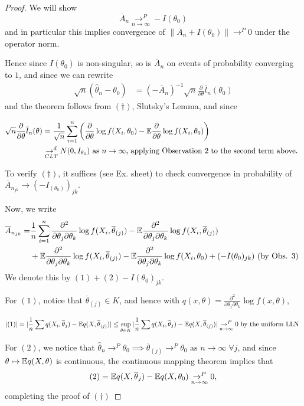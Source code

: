 \documentclass[a4paper]{article}
\begin{document}
\begin{proof}
	We will show
	\[
		\overline{A}_n \underset{n\to \infty}{\to ^{P}} -I(\theta_0) \tag{$\dagger$} 
	\]
	and in particular this implies convergence of $\|\overline{A}_n + I(\theta_0)\| \to ^{P} 0$ under the operator norm.

	Hence since $I(\theta_0)$ is non-singular, so is $\overline{A}_n$ on events of probability converging to $1$, and since we can rewrite
	\begin{align*}
		\sqrt{n}(\hat{\theta}_n - \theta_0) &= (-\overline{A}_n)^{-1} \sqrt{n} \frac{\partial}{\partial\theta} \overline{l}_n(\theta_0)   
	 \end{align*}
	 and the theorem follows from $(\dagger)$, Slutsky's Lemma, and since

	  \begin{align*}
		  \sqrt{n}\frac{\partial}{\partial\theta}\overline{l}_n(\theta) &= \frac{1}{\sqrt{n}} \sum_{i=1}^{n} \left( \frac{\partial}{\partial\theta} \log f(X_i, \theta_0) - \mathbb{E} \frac{\partial}{\partial\theta} \log f(X_i,\theta_0) \right) \\
		  & \underset{CLT}{\to ^{d}} N(0, I_{\theta_0}) \text{ as $n\to \infty$, applying Observation 2 to the second term above. } 
	 \end{align*}

	 To verify $(\dagger)$, it suffices (see Ex. sheet) to check convergence in probability of $\overline{A}_{n_{jk}}\to (-I_(\theta_0))_{jk}$.

	 Now, we write
	 \begin{align*}
		 \overline{A}_{n_{jk}} = &\frac{1}{n} \sum_{i=1}^{n}\frac{\partial^2}{\partial\theta_j \partial\theta_k} \log f(X_i, \overline{\theta}_{(j)}) - \mathbb{E} \frac{\partial^2}{\partial\theta_j \partial\theta_k} \log f(X_i, \overline{\theta}_{(j)}) \\
		 &+ \mathbb{E} \frac{\partial^2}{\partial\theta_j \partial\theta_k} \log f(X_i, \overline{\theta}_{(j)}) - \mathbb{E} \frac{\partial^2}{\partial\theta_j \partial\theta_k} \log f(X_i, \theta_0) + (-I(\theta_0)_{jk}) \text{ (by Obs. 3) } 
	 \end{align*}
	 We denote this by $(1) + (2) - I(\theta_0)_{jk}$.

	 For $(1)$, notice that $\overline{\theta}_{(j)} \in K$, and hence with $q(x,\theta) = \frac{\partial^2}{\partial\theta_j \partial\theta_k} \log f(x, \theta)$,

	 \[
		 |(1)| = |\frac{1}{n} \sum q(X_i, \overline{\theta}_j) - \mathbb{E} q(X, \overline{\theta}_{(j)})| \le \sup_{\theta \in K} |\frac{1}{n} \sum q(X_i, \overline{\theta}_j) - \mathbb{E} q(X, \overline{\theta}_{(j)})| \underset{n\to \infty}{\to ^{P}} 0 \text{ by the uniform LLN }
	 \] 

	 For $(2)$, we notice that  $\hat{\theta}_n \to ^{P} \theta_0 \implies \overline{\theta}_{(j)} \to ^{P} \theta_0 \text{ as } n\to \infty \;\forall j$, and since $\theta \mapsto \mathbb{E} q(X,\theta)$ is continuous, the continuous mapping theorem implies that 
	 \[
		 (2) = \mathbb{E} q(X, \overline{\theta}_j) - \mathbb{E} q(X, \theta_0) \underset{n\to \infty}{\to ^{P}} 0
	 ,\]
	 completing the proof of $(\dagger)$

\end{proof}
\end{document}
